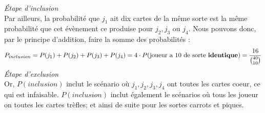 \documentclass[8pt]{report}
\begin{document}
        \noindent \textcolor{myb}{\textit{Étape d'inclusion}} \\
        \indent Par ailleurs, la probabilité que $j_1$ ait dix cartes de la même sorte est la même probabilité que cet 
        évènement ce produise pour $j_2, j_3$ ou $j_4$. Nous pouvons donc, par le principe d'addition, faire la somme des 
        probabilités : 
        \[ P_{inclusion} = P(j_1) + P(j_2) + P(j_3) + P(j_4) = 4\cdot P(\text{joueur a 10 de sorte \textbf{identique}})
        = \dfrac{16}{{40 \choose 10}}  \]
        \noindent \textcolor{myb}{\textit{Étape d'exclusion}} \\
        Or, $P(inclusion)$ inclut le scénario où $j_1, j_2, j_3, j_4$ ont toutes les cartes coeur, ce qui est infaisable. 
        $P(inclusion)$ inclut également le scénarios où tous les joueur on toutes les cartes trèfles; et ainsi de suite 
        pour les sortes carrots et piques. 
\end{document}
